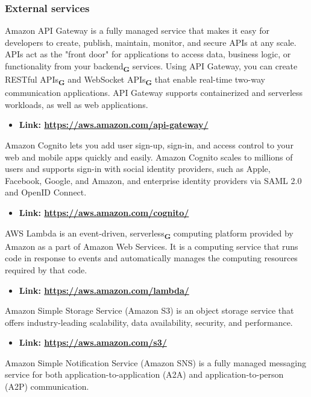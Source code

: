 \subsubsection{External services}
Amazon API Gateway is a fully managed service that makes it easy for developers to create, publish, maintain, monitor,
and secure APIs at any scale. APIs act as the "front door" for applications to access data, business logic,
or functionality from your backend\textsubscript{\textbf{G}} services. Using API Gateway, you can create RESTful APIs\textsubscript{\textbf{G}} and WebSocket APIs\textsubscript{\textbf{G}} that
enable real-time two-way communication applications. API Gateway supports containerized and serverless workloads,
as well as web applications.
\begin{itemize}
    \item \textbf{Link: \url{https://aws.amazon.com/api-gateway/}}
\end{itemize}
Amazon Cognito lets you add user sign-up, sign-in, and access control to your web and mobile apps quickly and easily.
Amazon Cognito scales to millions of users and supports sign-in with social identity providers, such as Apple,
Facebook, Google, and Amazon, and enterprise identity providers via SAML 2.0 and OpenID Connect.
\begin{itemize}
    \item \textbf{Link: \url{https://aws.amazon.com/cognito/}}
\end{itemize}
AWS Lambda is an event-driven, serverless\textsubscript{\textbf{G}} computing platform provided by Amazon as a part of Amazon Web Services.
It is a computing service that runs code in response to events and automatically manages the computing resources required by that code.
\begin{itemize}
    \item \textbf{Link: \url{https://aws.amazon.com/lambda/}}
\end{itemize}
Amazon Simple Storage Service (Amazon S3) is an object storage service that offers industry-leading scalability,
data availability, security, and performance.
\begin{itemize}
    \item \textbf{Link: \url{https://aws.amazon.com/s3/}}
\end{itemize}
Amazon Simple Notification Service (Amazon SNS) is a fully managed messaging service for both application-to-application (A2A) and application-to-person (A2P) communication.
